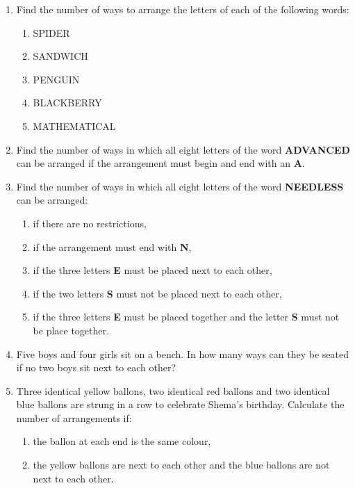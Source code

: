 \begin{enumerate}
\end{enumerate}



\exercise   %

\begin{enumerate}
	\item Find the number of ways to arrange the letters of each of the following words:
	\begin{enumerate}
		\item SPIDER
		\item SANDWICH
		\item PENGUIN
		\item BLACKBERRY
		\item MATHEMATICAL
	\end{enumerate}

   \item Find the number of ways in which all eight letters of the word \textbf{ADVANCED} can be arranged if the arrangement must begin and end with an \textbf{A}.
   
   \item Find the number of ways in which all eight letters of the word \textbf{NEEDLESS} can be arranged:
   \begin{enumerate}
   	\item if there are no restrictions,
   	\item if the arrangement must end with \textbf{N},
   	\item if the three letters \textbf{E} must be placed next to each other,
   	\item if the two letters \textbf{S} must  not be placed next to each other,
   	\item if the three letters \textbf{E} must be placed together and the letter \textbf{S} must not be place together.
   \end{enumerate}

\item Five boys and four girls sit on a bench. In how many ways can they be seated if no two boys  sit next to each other?

\item Three identical yellow ballons, two identical red ballons and two identical blue ballons are strung in a row to celebrate Shema's birthday. Calculate the number of arrangements if:

\begin{enumerate}
	\item the ballon at each end is the same colour,
	\item the yellow ballons are next to each other and the blue ballons are not next to each other.
\end{enumerate}


\end{enumerate}
